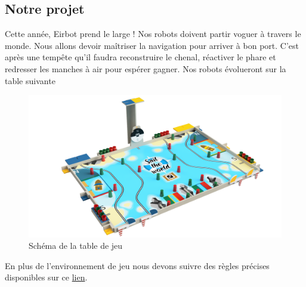 \documentclass[a4paper,10pt]{article}
\begin{document}
\begin{spacing}{1.5}
\section{Notre projet}
Cette année, Eirbot prend le large ! Nos robots doivent partir voguer à travers
le monde. Nous allons devoir maîtriser la navigation pour arriver à bon port.
C'est après une tempête qu'il faudra reconstruire le chenal, réactiver le phare
et redresser les manches à air pour espérer gagner. Nos robots évolueront sur la
table suivante
\begin{figure}[H]
  \center
  \includegraphics[scale=0.2]{table.png}
  \caption{Schéma de la table de jeu}
\end{figure}
En plus de l'environnement de jeu nous devons suivre des règles précises
disponibles sur ce \href{https://www.coupederobotique.fr/wp-content/uploads/Eurobot2020_Rules_Cup_OFFICIAL_FR.pdf}{lien}.

\end{spacing}
\end{document}
